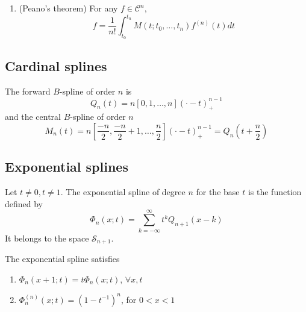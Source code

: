 \begin{prop}
  \begin{enumerate}
    \item (Peano's theorem) For any $f \in \mathcal{C}^n$, 
      \begin{equation*}
	[t_0, \ldots, t_n]f = \frac{1}{n!}\int_{t_0}^{t_n} M(t;t_0, \ldots, t_n)f^{(n)}(t)dt
      \end{equation*}
  \end{enumerate}
\end{prop}

\subsection{Cardinal splines}

\begin{deftn}
  The forward $B$-spline of order $n$ is
  \begin{equation*}
    Q_n(t) = n[0, 1, \ldots, n]{(\cdot-t)}_{+}^{n-1}
  \end{equation*}
  and the central $B$-spline of order $n$
  \begin{equation*}
    M_n(t) = n\left[\frac{-n}{2}, \frac{-n}{2}+1, \ldots, \frac{n}{2}\right]{(\cdot-t)}_{+}^{n-1} = Q_n(t+\frac{n}{2})
  \end{equation*}
\end{deftn}

\subsection{Exponential splines}

\begin{deftn}
  Let $t \neq 0, t \neq 1$. The exponential spline of degree $n$ for the base $t$ is the function defined by
  \begin{equation}
    \Phi_n(x;t) = \sum_{k=-\infty}^{\infty} t^k Q_{n+1}(x-k)
  \end{equation}
  It belongs to the space $\mathscr{S}_{n+1}$.
\end{deftn}

\begin{prop}
  The exponential spline satisfies
  \begin{enumerate}
    \item $\Phi_n(x+1;t) = t\Phi_n(x;t)$, $\forall x,t$
    \item $\Phi_n^{(n)}(x;t) = {(1-t^{-1})}^n$, for $0 < x < 1$
  \end{enumerate}
\end{prop}

